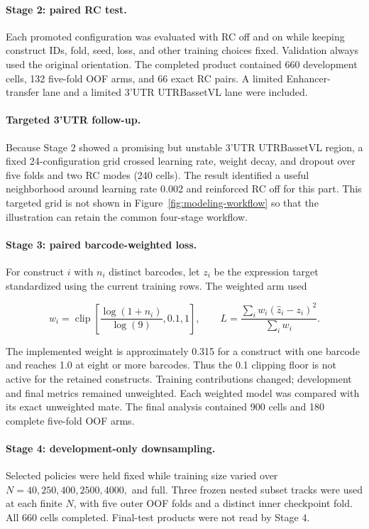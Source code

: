 \documentclass[11pt]{article}
\begin{document}
\paragraph{Stage 2: paired RC test.}
Each promoted configuration was evaluated with RC off and on while keeping
construct IDs, fold, seed, loss, and other training choices fixed. Validation
always used the original orientation. The completed product contained 660
development cells, 132 five-fold OOF arms, and 66 exact RC pairs. A limited
Enhancer-transfer lane and a limited 3'UTR UTRBassetVL lane were included.

\paragraph{Targeted 3'UTR follow-up.}
Because Stage 2 showed a promising but unstable 3'UTR UTRBassetVL region, a
fixed 24-configuration grid crossed learning rate, weight decay, and dropout
over five folds and two RC modes (240 cells). The result identified a useful
neighborhood around learning rate 0.002 and reinforced RC off for this part.
This targeted grid is not shown in Figure~\ref{fig:modeling-workflow} so that
the illustration can retain the common four-stage workflow.

\paragraph{Stage 3: paired barcode-weighted loss.}
For construct $i$ with $n_i$ distinct barcodes, let $z_i$ be the expression
target standardized using the current training rows. The weighted arm used

\begin{equation}
w_i=\operatorname{clip}\left[
\frac{\log(1+n_i)}{\log(9)},0.1,1\right], \qquad
L=\frac{\sum_i w_i(\widehat z_i-z_i)^2}{\sum_i w_i}.
\label{eq:weightedloss}
\end{equation}

The implemented weight is approximately 0.315 for a construct with one barcode
and reaches 1.0 at eight or more barcodes. Thus the 0.1 clipping floor is not
active for the retained constructs. Training contributions changed;
development and final metrics remained unweighted. Each weighted model was
compared with its exact unweighted mate. The final analysis contained 900 cells
and 180 complete five-fold OOF arms.

\paragraph{Stage 4: development-only downsampling.}
Selected policies were held fixed while training size varied over
$N=40,250,400,2500,4000,$ and full. Three frozen nested subset tracks were used
at each finite $N$, with five outer OOF folds and a distinct inner checkpoint
fold. All 660 cells completed. Final-test products were not read by Stage 4.
\end{document}
